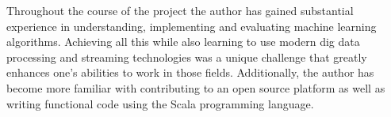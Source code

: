 \documentclass{l4proj}
\begin{document}
Throughout the course of the project the author has gained substantial experience in understanding, implementing and evaluating machine learning algorithms. Achieving all this while also learning to use modern dig data processing and streaming technologies was a unique challenge that greatly enhances one's abilities to work in those fields. Additionally, the author has become more familiar with  contributing to an open source platform as well as writing functional code using the Scala programming language.





\end{document}
